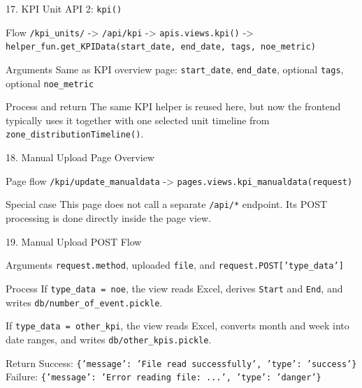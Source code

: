\documentclass[aspectratio=169]{beamer}
\begin{document}
\begin{frame}{17. KPI Unit API 2: \texttt{kpi()}}
\justifying
\begin{block}{Flow}
\texttt{/kpi\_units/} -> \texttt{/api/kpi} ->
\texttt{apis.views.kpi()} ->
\texttt{helper\_fun.get\_KPIData(start\_date, end\_date, tags, noe\_metric)}
\end{block}

\begin{block}{Arguments}
Same as KPI overview page:
\texttt{start\_date}, \texttt{end\_date}, optional \texttt{tags}, optional \texttt{noe\_metric}
\end{block}

\begin{block}{Process and return}
The same KPI helper is reused here, but now the frontend typically uses it together with one selected unit timeline from \texttt{zone\_distributionTimeline()}.
\end{block}
\end{frame}

\begin{frame}{18. Manual Upload Page Overview}
\justifying
\begin{block}{Page flow}
\texttt{/kpi/update\_manualdata} ->
\texttt{pages.views.kpi\_manualdata(request)}
\end{block}

\begin{block}{Special case}
This page does not call a separate \texttt{/api/*} endpoint.
Its POST processing is done directly inside the page view.
\end{block}
\end{frame}

\begin{frame}{19. Manual Upload POST Flow}
\justifying
\begin{block}{Arguments}
\texttt{request.method}, uploaded \texttt{file}, and
\texttt{request.POST['type\_data']}
\end{block}

\begin{block}{Process}
If \texttt{type\_data = noe}, the view reads Excel, derives
\texttt{Start} and \texttt{End}, and writes
\texttt{db/number\_of\_event.pickle}.

If \texttt{type\_data = other\_kpi}, the view reads Excel,
converts month and week into date ranges, and writes
\texttt{db/other\_kpis.pickle}.
\end{block}

\begin{block}{Return}
Success: \texttt{\{'message': 'File read successfully', 'type': 'success'\}}\\
Failure: \texttt{\{'message': 'Error reading file: ...', 'type': 'danger'\}}
\end{block}
\end{frame}
\end{document}
